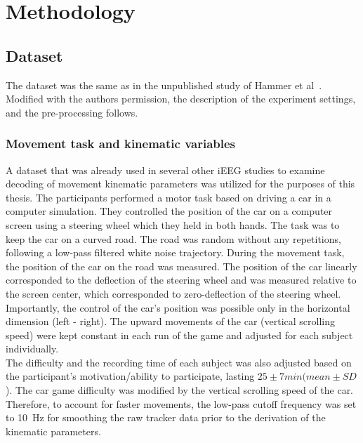 \chapter{Methodology}\label{ch:methodology}


\section{Dataset}\label{sec:dataset}
The dataset was the same as in the unpublished study of Hammer et al~\cite{Hammer-2021}.
Modified with the authors permission, the description of the experiment settings, and the pre-processing follows.

\subsection{Movement task and kinematic variables}\label{subsec:movement-task-and-kinematic-variables}
A dataset that was already used in several other iEEG studies to examine decoding of movement kinematic parameters\cite{Hammer-2021,hammer-predominance-2016,hammer-role-2013} was utilized for the purposes of this thesis.
The participants performed a motor task based on driving a car in a computer simulation.
They controlled the position of the car on a computer screen using a steering wheel which they held in both hands.
The task was to keep the car on a curved road.
The road was random without any repetitions, following a low-pass filtered white noise trajectory.
During the movement task, the position of the car on the road was measured.
The position of the car linearly corresponded to the deflection of the steering wheel and was measured relative to the screen center, which corresponded to zero-deflection of the steering wheel.
Importantly, the control of the car's position was possible only in the horizontal dimension (left - right).
The upward movements of the car (vertical scrolling speed) were kept constant in each run of the game and adjusted for each subject individually. \\

The difficulty and the recording time of each subject was also adjusted based on the participant's motivation/ability to participate, lasting $25 \pm 7 min (mean \pm SD$).
The car game difficulty was modified by the vertical scrolling speed of the car.
Therefore, to account for faster movements, the low-pass cutoff frequency was set to 10~Hz for smoothing the raw tracker data prior to the derivation of the kinematic parameters. \\


